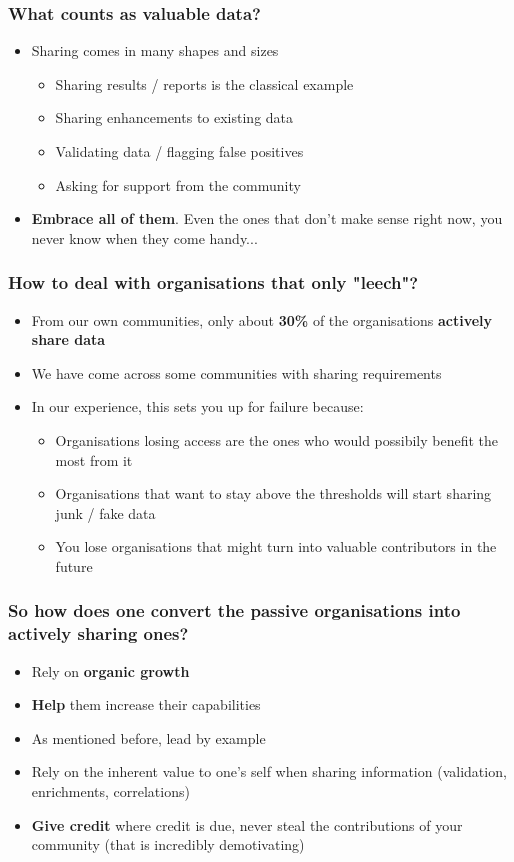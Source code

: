 \begin{frame}
\frametitle{What counts as valuable data?}
\begin{itemize}
	\item Sharing comes in many shapes and sizes
	\begin{itemize}
		\item Sharing results / reports is the classical example
		\item Sharing enhancements to existing data
		\item Validating data / flagging false positives
		\item Asking for support from the community
	\end{itemize}
\item {\bf Embrace all of them}. Even the ones that don't make sense right now, you never know when they come handy...
\end{itemize}
\end{frame}

\begin{frame}
\frametitle{How to deal with organisations that only "leech"?}
\begin{itemize}
    \item From our own communities, only about {\bf 30\%} of the organisations {\bf actively share data}
	\item We have come across some communities with sharing requirements
	\item In our experience, this sets you up for failure because:
	\begin{itemize}
		\item Organisations losing access are the ones who would possibily benefit the most from it
		\item Organisations that want to stay above the thresholds will start sharing junk / fake data
		\item You lose organisations that might turn into valuable contributors in the future
	\end{itemize}
\end{itemize}
\end{frame}

\begin{frame}
\frametitle{So how does one convert the passive organisations into actively sharing ones?}
\begin{itemize}
    \item Rely on {\bf organic growth}
    \item {\bf Help} them increase their capabilities
	\item As mentioned before, lead by example
	\item Rely on the inherent value to one's self when sharing information (validation, enrichments, correlations)
    \item {\bf Give credit} where credit is due, never steal the contributions of your community (that is incredibly demotivating)
\end{itemize}
\end{frame}

